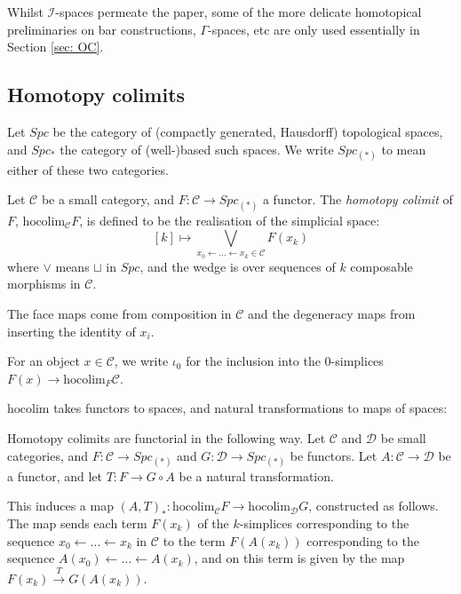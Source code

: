 \documentclass{TPmod}
\newcommand{\hocolim}{\mathrm{hocolim}}
\newcommand{\cC}{\mathcal{C}}
\newcommand{\cD}{\mathcal{D}}
\newcommand{\cI}{\mathcal{I}}
\numberwithin{equation}{section}
\begin{document}
Whilst $\cI$-spaces permeate the paper, some of the more delicate homotopical  preliminaries on bar constructions, $\Gamma$-spaces, etc are only used essentially in Section \ref{sec: OC}.

\subsection{Homotopy colimits}\label{sec: hocolim}

    Let $Spc$ be the category of (compactly generated, Hausdorff) topological spaces, and $Spc_*$ the category of (well-)based such spaces. We write $Spc_{(*)}$ to mean either of these two categories.
    \begin{defn}
        Let $\cC$ be a small category, and $F: \cC \to Spc_{(*)}$ a functor. The \emph{homotopy colimit} of $F$, $\hocolim_\cC F$, is defined to be the realisation of the simplicial space:
        \begin{equation}\label{eq: hocolim}
            [k] \mapsto \bigvee\limits_{x_0 \leftarrow \ldots \leftarrow x_k \in \cC} F(x_k)
        \end{equation}
        where $\vee$ means $\sqcup$ in $Spc$, and the wedge is over sequences of $k$ composable morphisms in $\cC$.

        The face maps come from composition in $\cC$ and the degeneracy maps from inserting the identity of $x_i$.

        For an object $x \in \cC$, we write $\iota_0$ for the inclusion into the 0-simplices $F(x) \to \hocolim_F \cC$.
    \end{defn}
    $\hocolim$ takes functors to spaces, and natural transformations to maps of spaces:
    \begin{defn}\label{def: hocolim func}

        Homotopy colimits are functorial in the following way. Let $\cC$ and $\cD$ be small categories, and $F: \cC \to Spc_{(*)}$ and $G: \cD \to Spc_{(*)}$ be functors. Let $A: \cC \to \cD$ be a functor, and let $T: F \to G \circ A$ be a natural transformation.
    
        This induces a map $(A,T)_*: \hocolim_\cC F \to \hocolim_\cD G$, constructed as follows. The map sends each term $F(x_k)$ of the $k$-simplices corresponding to the sequence $x_0 \leftarrow \ldots \leftarrow x_k$ in $\cC$ to the term $F(A(x_k))$ corresponding to the sequence $A(x_0) \leftarrow \ldots \leftarrow A(x_k)$, and on this term is given by the map $F(x_k) \xrightarrow{T} G( A(x_k))$.
    \end{defn}
\end{document}
